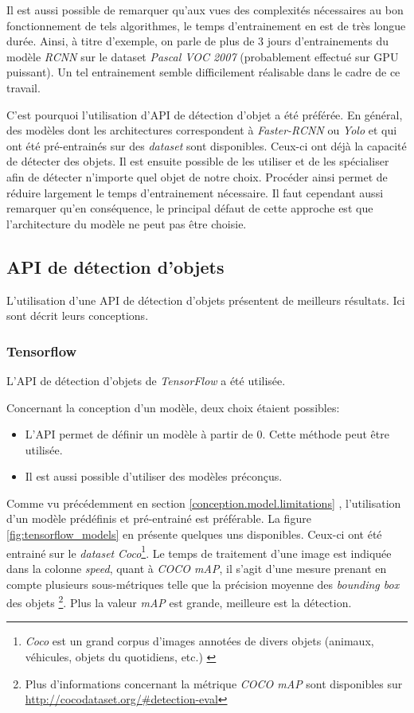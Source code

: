 Il est aussi possible de remarquer qu'aux vues des complexités nécessaires au bon fonctionnement de tels algorithmes, le temps d'entrainement en est de très longue durée. Ainsi, à titre d'exemple, on parle de plus de 3 jours d'entrainements du modèle \textit{RCNN} sur le dataset \textit{Pascal VOC 2007}\autocite{info:training} (probablement effectué sur GPU puissant). Un tel entrainement semble difficilement réalisable dans le cadre de ce travail.

C'est pourquoi l'utilisation d'API de détection d'objet a été préférée. En général, des modèles dont les architectures correspondent à \textit{Faster-RCNN} ou \textit{Yolo} et qui ont été pré-entrainés sur des \textit{dataset} sont disponibles. Ceux-ci ont déjà la capacité de détecter des objets. Il est ensuite possible de les utiliser et de les spécialiser afin de détecter n'importe quel objet de notre choix. Procéder ainsi permet de réduire largement le temps d'entrainement nécessaire. Il faut cependant aussi remarquer qu'en conséquence, le principal défaut de cette approche est que l'architecture du modèle ne peut pas être choisie.

\subsection{API de détection d'objets}\label{conception.model.object}

L'utilisation d'une API de détection d'objets présentent de meilleurs résultats. Ici sont décrit leurs conceptions.

\subsubsection{Tensorflow}
L'API de détection d'objets de \textit{TensorFlow} a été utilisée.

Concernant la conception d'un modèle, deux choix étaient possibles:
\begin{itemize}
    \item L'API permet de définir un modèle à partir de 0. Cette méthode peut être utilisée.
    \item Il est aussi possible d'utiliser des modèles préconçus. 
\end{itemize}

Comme vu précédemment en section \ref{conception.model.limitations} , l'utilisation d'un modèle prédéfinis et pré-entrainé est préférable. La figure \ref{fig:tensorflow_models} en présente quelques uns disponibles. Ceux-ci ont été entrainé sur le \textit{dataset} \textit{Coco}\footnote{\textit{Coco} est un grand corpus d'images annotées de divers objets (animaux, véhicules, objets du quotidiens, etc.) \autocite{data:coco}}. Le temps de traitement d'une image est indiquée dans la colonne \textit{speed}, quant à \textit{COCO mAP}, il s'agit d'une mesure prenant en compte plusieurs sous-métriques telle que la précision moyenne des \textit{bounding box} des objets \footnote{Plus d'informations concernant la métrique \textit{COCO mAP} sont disponibles sur \url{http://cocodataset.org/\#detection-eval}}. Plus la valeur \textit{mAP} est grande, meilleure est la détection.

